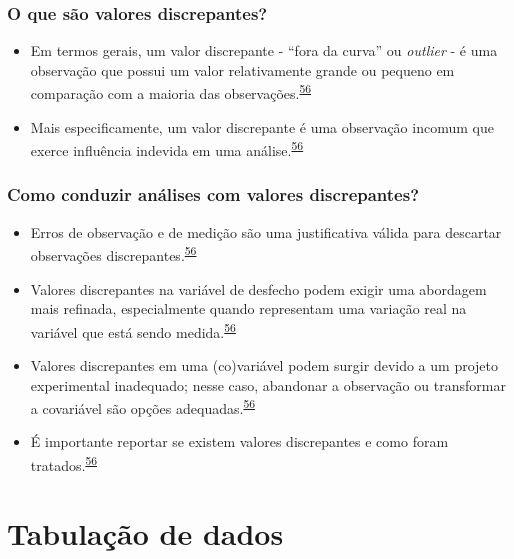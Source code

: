 \documentclass[
]{book}
\begin{document}
\hypertarget{o-que-suxe3o-valores-discrepantes}{%
\subsection{O que são valores discrepantes?}\label{o-que-suxe3o-valores-discrepantes}}

\begin{itemize}
\item
  Em termos gerais, um valor discrepante - ``fora da curva'' ou \emph{outlier} - é uma observação que possui um valor relativamente grande ou pequeno em comparação com a maioria das observações.\textsuperscript{\protect\hyperlink{ref-zuur2009}{56}}
\item
  Mais especificamente, um valor discrepante é uma observação incomum que exerce influência indevida em uma análise.\textsuperscript{\protect\hyperlink{ref-zuur2009}{56}}
\end{itemize}

\hypertarget{como-conduzir-anuxe1lises-com-valores-discrepantes}{%
\subsection{Como conduzir análises com valores discrepantes?}\label{como-conduzir-anuxe1lises-com-valores-discrepantes}}

\begin{itemize}
\item
  Erros de observação e de medição são uma justificativa válida para descartar observações discrepantes.\textsuperscript{\protect\hyperlink{ref-zuur2009}{56}}
\item
  Valores discrepantes na variável de desfecho podem exigir uma abordagem mais refinada, especialmente quando representam uma variação real na variável que está sendo medida.\textsuperscript{\protect\hyperlink{ref-zuur2009}{56}}
\item
  Valores discrepantes em uma (co)variável podem surgir devido a um projeto experimental inadequado; nesse caso, abandonar a observação ou transformar a covariável são opções adequadas.\textsuperscript{\protect\hyperlink{ref-zuur2009}{56}}
\item
  É importante reportar se existem valores discrepantes e como foram tratados.\textsuperscript{\protect\hyperlink{ref-zuur2009}{56}}
\end{itemize}

\hypertarget{tabulacao-dados}{%
\chapter{\texorpdfstring{\textbf{Tabulação de dados}}{Tabulação de dados}}\label{tabulacao-dados}}
\end{document}
